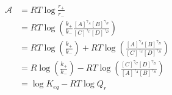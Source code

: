 \begin{eqnarray}\label{eqn:reaction-affinity-ratio}
\mathcal A &= RT\log\frac{r_+}{r_-} \\
& = RT\log\left(\frac{k_+}{k_-}\frac{[A]^{\gamma_A}[B]^{\gamma_B}}{[C]^{\gamma_C}[D]^{\gamma_D}}\right) \\
& = RT\log\left(\frac{k_+}{k_-}\right) + RT\log\left(\frac{[A]^{\gamma_A}[B]^{\gamma_B}}{[C]^{\gamma_C}[D]^{\gamma_D}}\right) \\
& = R\log\left(\frac{k_+}{k_-}\right) - RT\log\left(\frac{[C]^{\gamma_C}[D]^{\gamma_D}}{[A]^{\gamma_A}[B]^{\gamma_B}}\right) \\
& = \log K_{eq} - RT\log{Q_r} \\
\end{eqnarray}